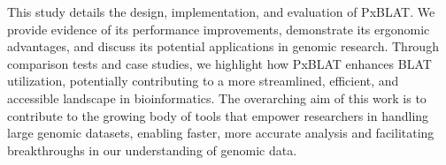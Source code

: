 This study details the design, implementation, and evaluation of PxBLAT.
We provide evidence of its performance improvements, demonstrate its ergonomic advantages, and discuss its potential applications in genomic research.
Through comparison tests and case studies, we highlight how PxBLAT enhances BLAT utilization, potentially contributing to a more streamlined, efficient, and accessible landscape in bioinformatics.
The overarching aim of this work is to contribute to the growing body of tools that empower researchers in handling large genomic datasets, enabling faster, more accurate analysis and facilitating breakthroughs in our understanding of genomic data.





%

%


